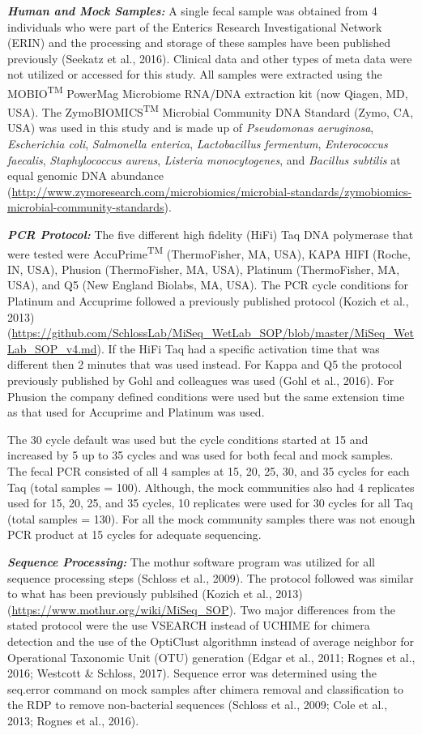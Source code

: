 \documentclass[12pt,]{article}
\begin{document}
\textbf{\emph{Human and Mock Samples:}} A single fecal sample was
obtained from 4 individuals who were part of the Enterics Research
Investigational Network (ERIN) and the processing and storage of these
samples have been published previously (Seekatz et al., 2016). Clinical
data and other types of meta data were not utilized or accessed for this
study. All samples were extracted using the MOBIO\textsuperscript{TM}
PowerMag Microbiome RNA/DNA extraction kit (now Qiagen, MD, USA). The
ZymoBIOMICS\textsuperscript{TM} Microbial Community DNA Standard (Zymo,
CA, USA) was used in this study and is made up of \emph{Pseudomonas
aeruginosa}, \emph{Escherichia coli}, \emph{Salmonella enterica},
\emph{Lactobacillus fermentum}, \emph{Enterococcus faecalis},
\emph{Staphylococcus aureus}, \emph{Listeria monocytogenes}, and
\emph{Bacillus subtilis} at equal genomic DNA abundance
(\url{http://www.zymoresearch.com/microbiomics/microbial-standards/zymobiomics-microbial-community-standards}).

\textbf{\emph{PCR Protocol:}} The five different high fidelity (HiFi)
Taq DNA polymerase that were tested were AccuPrime\textsuperscript{TM}
(ThermoFisher, MA, USA), KAPA HIFI (Roche, IN, USA), Phusion
(ThermoFisher, MA, USA), Platinum (ThermoFisher, MA, USA), and Q5 (New
England Biolabs, MA, USA). The PCR cycle conditions for Platinum and
Accuprime followed a previously published protocol (Kozich et al., 2013)
(\url{https://github.com/SchlossLab/MiSeq_WetLab_SOP/blob/master/MiSeq_WetLab_SOP_v4.md}).
If the HiFi Taq had a specific activation time that was different then 2
minutes that was used instead. For Kappa and Q5 the protocol previously
published by Gohl and colleagues was used (Gohl et al., 2016). For
Phusion the company defined conditions were used but the same extension
time as that used for Accuprime and Platinum was used.

The 30 cycle default was used but the cycle conditions started at 15 and
increased by 5 up to 35 cycles and was used for both fecal and mock
samples. The fecal PCR consisted of all 4 samples at 15, 20, 25, 30, and
35 cycles for each Taq (total samples = 100). Although, the mock
communities also had 4 replicates used for 15, 20, 25, and 35 cycles, 10
replicates were used for 30 cycles for all Taq (total samples = 130).
For all the mock community samples there was not enough PCR product at
15 cycles for adequate sequencing.

\textbf{\emph{Sequence Processing:}} The mothur software program was
utilized for all sequence processing steps (Schloss et al., 2009). The
protocol followed was similar to what has been previously publsihed
(Kozich et al., 2013) (\url{https://www.mothur.org/wiki/MiSeq_SOP}). Two
major differences from the stated protocol were the use VSEARCH instead
of UCHIME for chimera detection and the use of the OptiClust algorithmn
instead of average neighbor for Operational Taxonomic Unit (OTU)
generation (Edgar et al., 2011; Rognes et al., 2016; Westcott \&
Schloss, 2017). Sequence error was determined using the seq.error
command on mock samples after chimera removal and classification to the
RDP to remove non-bacterial sequences (Schloss et al., 2009; Cole et
al., 2013; Rognes et al., 2016).
\end{document}
